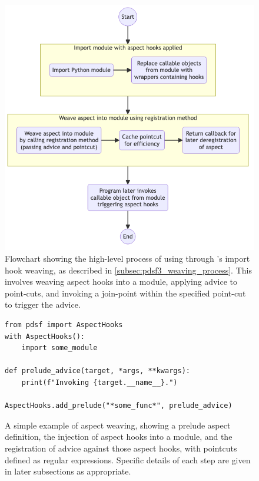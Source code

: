 \begin{figure}
  \centering
  \includegraphics[width=0.7\columnwidth]{40_pydysofu_rewrite/diagrams/aspect-hook-weaving-high-level.png}
  \caption{Flowchart showing the high-level process of using \aop{} through
  \pdsfthree{}'s import hook weaving, as described in
  \cref{subsec:pdsf3_weaving_process}. This involves weaving aspect hooks into a
  module, applying advice to point-cuts, and invoking a join-point within the
  specified point-cut to trigger the advice.}
  \label{fig:high-level-import-hook-weaving-steps}
\end{figure}


\begin{figure}
    \begin{lstlisting}[style=footnotesize_python]
from pdsf import AspectHooks
with AspectHooks():
    import some_module
    
def prelude_advice(target, *args, **kwargs):
    print(f"Invoking {target.__name__}.")

AspectHooks.add_prelude("*some_func*", prelude_advice)
    \end{lstlisting}
    \caption{A simple example of aspect weaving, showing a prelude aspect definition, the injection of aspect hooks into a module, and the registration of advice against those aspect hooks, with pointcuts defined as regular expressions. Specific details of each step are given in later subsections as appropriate.}
    \label{fig:simple_example_of_aspect_weaving}
\end{figure}

